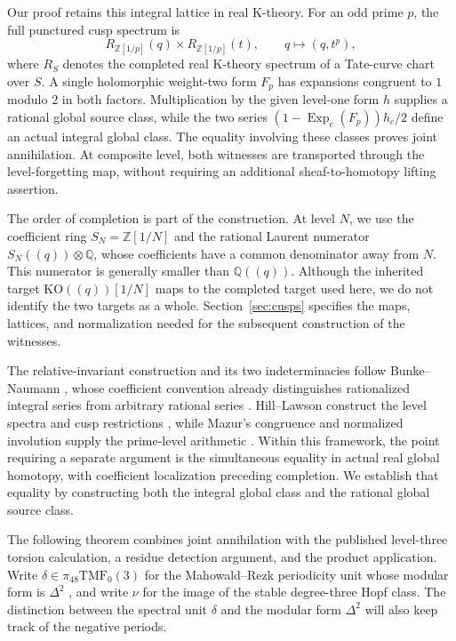 \documentclass[11pt,a4paper]{amsart}
\newcommand{\Z}{\mathbb Z}
\newcommand{\Q}{\mathbb Q}
\newcommand{\TMF}{\mathrm{TMF}}
\newcommand{\KO}{\mathrm{KO}}
\newcommand{\Exp}{\operatorname{Exp}}
\theoremstyle{plain}
\theoremstyle{definition}
\theoremstyle{remark}
\begin{document}
Our proof retains this integral lattice in real K-theory. For an odd
prime $p$, the full punctured cusp spectrum is
\[
 R_{\Z[1/p]}(q)\times R_{\Z[1/p]}(t),
 \qquad q\longmapsto(q,t^p),
\]
where $R_S$ denotes the completed real K-theory spectrum of a
Tate-curve chart over $S$. A single holomorphic weight-two form $F_p$
has expansions congruent to $1$ modulo $2$ in both factors.
Multiplication by the given level-one form $h$ supplies a rational
global source class, while the two series
$(1-\Exp_c(F_p))h_c/2$ define an actual integral global class.
The equality involving these classes proves joint annihilation.
At composite level, both witnesses are transported through the
level-forgetting map, without requiring an additional
sheaf-to-homotopy lifting assertion.

The order of completion is part of the construction. At level $N$,
we use the coefficient ring $S_N=\Z[1/N]$ and the rational Laurent
numerator $S_N((q))\otimes\Q$, whose coefficients have a common
denominator away from $N$. This numerator is generally smaller than
$\Q((q))$. Although the inherited target $\KO((q))[1/N]$ maps to
the completed target used here, we do not identify the two targets
as a whole. Section~\ref{sec:cusps} specifies the maps, lattices,
and normalization needed for the subsequent construction of the
witnesses.

The relative-invariant construction and its two indeterminacies follow
Bunke--Naumann \cite[Section~4.3]{BN}, whose coefficient convention
already distinguishes rationalized integral series from arbitrary
rational series \cite[Section~4.1]{BN}. Hill--Lawson construct the
level spectra and cusp restrictions \cite[Sections~5--6]{HL}, while
Mazur's congruence and normalized involution supply the prime-level
arithmetic \cite[II, Sections~5--6]{Mazur}. Within this framework,
the point requiring a separate argument is the simultaneous equality
in actual real global homotopy, with coefficient localization preceding
completion. We establish that equality by constructing both the
integral global class and the rational global source class.

The following theorem combines joint annihilation with the published
level-three torsion calculation, a residue detection argument, and
the product application. Write $\delta\in\pi_{48}\TMF_0(3)$ for
the Mahowald--Rezk periodicity unit whose modular form is
$\Delta^2$ \cite[Proposition~4.1]{MR}, and write $\nu$ for the image
of the stable degree-three Hopf class. The distinction between the
spectral unit $\delta$ and the modular form $\Delta^2$ will also
keep track of the negative periods.
\end{document}
